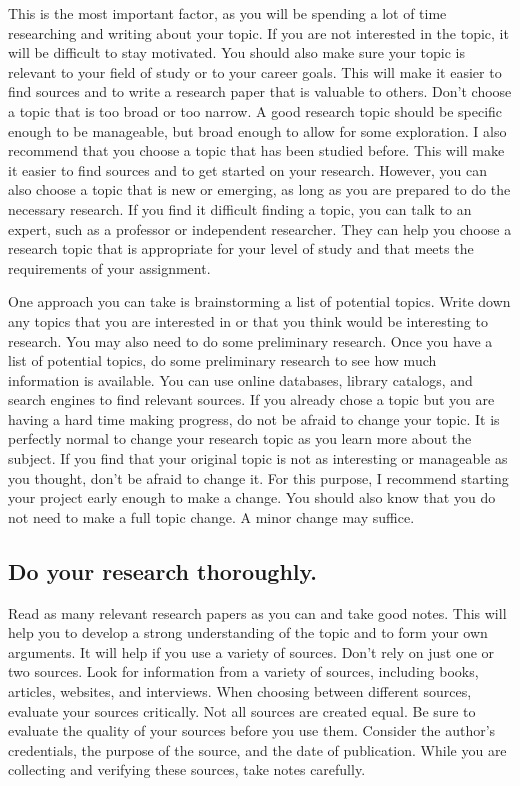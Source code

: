 \documentclass[
  b5paper]{book}
\begin{document}
This is the most important factor, as you will be spending a lot of time researching and writing about your topic. If you are not interested in the topic, it will be difficult to stay motivated. You should also make sure your topic is relevant to your field of study or to your career goals. This will make it easier to find sources and to write a research paper that is valuable to others. Don't choose a topic that is too broad or too narrow. A good research topic should be specific enough to be manageable, but broad enough to allow for some exploration. I also recommend that you choose a topic that has been studied before. This will make it easier to find sources and to get started on your research. However, you can also choose a topic that is new or emerging, as long as you are prepared to do the necessary research. If you find it difficult finding a topic, you can talk to an expert, such as a professor or independent researcher. They can help you choose a research topic that is appropriate for your level of study and that meets the requirements of your assignment.

One approach you can take is brainstorming a list of potential topics. Write down any topics that you are interested in or that you think would be interesting to research. You may also need to do some preliminary research. Once you have a list of potential topics, do some preliminary research to see how much information is available. You can use online databases, library catalogs, and search engines to find relevant sources. If you already chose a topic but you are having a hard time making progress, do not be afraid to change your topic. It is perfectly normal to change your research topic as you learn more about the subject. If you find that your original topic is not as interesting or manageable as you thought, don't be afraid to change it. For this purpose, I recommend starting your project early enough to make a change. You should also know that you do not need to make a full topic change. A minor change may suffice.

\hypertarget{do-your-research-thoroughly.}{%
\subsection*{Do your research thoroughly.}\label{do-your-research-thoroughly.}}

Read as many relevant research papers as you can and take good notes. This will help you to develop a strong understanding of the topic and to form your own arguments. It will help if you use a variety of sources. Don't rely on just one or two sources. Look for information from a variety of sources, including books, articles, websites, and interviews. When choosing between different sources, evaluate your sources critically. Not all sources are created equal. Be sure to evaluate the quality of your sources before you use them. Consider the author's credentials, the purpose of the source, and the date of publication. While you are collecting and verifying these sources, take notes carefully.
\end{document}
